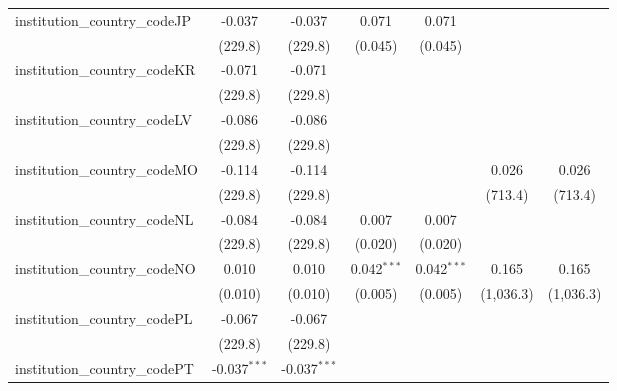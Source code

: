 \begin{tabular}{lcccccc}
   institution\_country\_codeJP          & -0.037         & -0.037         & 0.071          & 0.071          &               &   \\   
                                         & (229.8)        & (229.8)        & (0.045)        & (0.045)        &               &   \\   
   institution\_country\_codeKR          & -0.071         & -0.071         &                &                &               &   \\   
                                         & (229.8)        & (229.8)        &                &                &               &   \\   
   institution\_country\_codeLV          & -0.086         & -0.086         &                &                &               &   \\   
                                         & (229.8)        & (229.8)        &                &                &               &   \\   
   institution\_country\_codeMO          & -0.114         & -0.114         &                &                & 0.026         & 0.026\\   
                                         & (229.8)        & (229.8)        &                &                & (713.4)       & (713.4)\\   
   institution\_country\_codeNL          & -0.084         & -0.084         & 0.007          & 0.007          &               &   \\   
                                         & (229.8)        & (229.8)        & (0.020)        & (0.020)        &               &   \\   
   institution\_country\_codeNO          & 0.010          & 0.010          & 0.042$^{***}$  & 0.042$^{***}$  & 0.165         & 0.165\\   
                                         & (0.010)        & (0.010)        & (0.005)        & (0.005)        & (1,036.3)     & (1,036.3)\\   
   institution\_country\_codePL          & -0.067         & -0.067         &                &                &               &   \\   
                                         & (229.8)        & (229.8)        &                &                &               &   \\   
   institution\_country\_codePT          & -0.037$^{***}$ & -0.037$^{***}$ &                &                &               &   \\   

\end{tabular}
